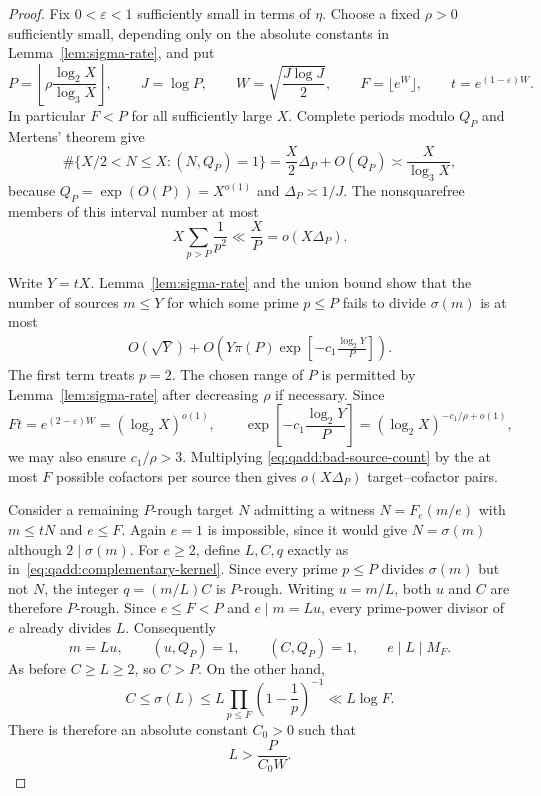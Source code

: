 \begin{proof}
Fix $0<\varepsilon<1$ sufficiently small in terms of $\eta$.
Choose a fixed $\rho>0$ sufficiently small, depending only on
the absolute constants in Lemma~\ref{lem:sigma-rate}, and put
\[
 P=\left\lfloor\rho\frac{\log_2X}{\log_3X}\right\rfloor,
 \qquad J=\log P,
 \qquad W=\sqrt{\frac{J\log J}{2}},
 \qquad F=\lfloor e^W\rfloor,
 \qquad t=e^{(1-\varepsilon)W}.
\]
In particular $F<P$ for all sufficiently large $X$.
Complete periods modulo $Q_P$ and Mertens' theorem give
\begin{equation}
\label{eq:qadd:rough-target-count}
 \#\{X/2<N\leq X:(N,Q_P)=1\}
 =\frac X2\Delta_P+O(Q_P)
 \asymp\frac X{\log_3X},
\end{equation}
because $Q_P=\exp(O(P))=X^{o(1)}$ and
$\Delta_P\asymp1/J$. The nonsquarefree members of this interval
number at most
\[
 X\sum_{p>P}\frac1{p^2}\ll\frac XP
 =o(X\Delta_P).
\]

Write $Y=tX$. Lemma~\ref{lem:sigma-rate} and the union bound
show that the number of sources $m\leq Y$ for which some prime
$p\leq P$ fails to divide $\sigma(m)$ is at most
\begin{align}
 O(\sqrt Y)
 +O\left(
      Y\pi(P)
       \exp\left[-c_1\frac{\log_2Y}{P}\right]
    \right).
 \label{eq:qadd:bad-source-count}
\end{align}
The first term treats $p=2$. The chosen range of $P$ is
permitted by Lemma~\ref{lem:sigma-rate} after decreasing
$\rho$ if necessary. Since
\[
 Ft=e^{(2-\varepsilon)W}
      =(\log_2X)^{o(1)},
 \qquad
 \exp\left[-c_1\frac{\log_2Y}{P}\right]
      =(\log_2X)^{-c_1/\rho+o(1)},
\]
we may also ensure $c_1/\rho>3$. Multiplying
\eqref{eq:qadd:bad-source-count} by the at most $F$ possible
cofactors per source then gives $o(X\Delta_P)$ target--cofactor
pairs.

Consider a remaining $P$-rough target $N$ admitting a witness
$N=F_e(m/e)$ with $m\leq tN$ and $e\leq F$.
Again $e=1$ is impossible, since it would give
$N=\sigma(m)$ although $2\mid\sigma(m)$.
For $e\geq2$, define $L,C,q$ exactly as
in~\eqref{eq:qadd:complementary-kernel}. Since every prime
$p\leq P$ divides $\sigma(m)$ but not $N$, the integer
$q=(m/L)C$ is $P$-rough. Writing $u=m/L$, both $u$ and $C$
are therefore $P$-rough. Since $e\leq F<P$ and $e\mid m=Lu$,
every prime-power divisor of $e$ already divides $L$.
Consequently
\[
 m=Lu,
 \qquad (u,Q_P)=1,
 \qquad (C,Q_P)=1,
 \qquad e\mid L\mid M_F.
\]
As before $C\geq L\geq2$, so $C>P$. On the other hand,
\[
 C\leq\sigma(L)
 \leq L\prod_{p\leq F}\left(1-\frac1p\right)^{-1}
 \ll L\log F.
\]
There is therefore an absolute constant $C_0>0$ such that
\begin{equation}
\label{eq:qadd:moving-kernel-lower-bound}
 L>\frac P{C_0W}.
\end{equation}


\end{proof}
